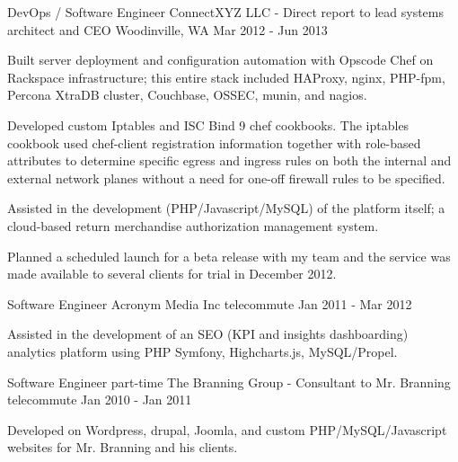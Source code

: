 \begin{cventries}
    \cventry
    {DevOps / Software Engineer}
    {ConnectXYZ LLC - Direct report to lead systems architect and CEO}
    {Woodinville, WA}
    {Mar 2012 - Jun 2013}
    {
        \begin{cvitems}
        \item {Built server deployment and configuration automation with Opscode Chef on Rackspace infrastructure; this entire stack included HAProxy, nginx, PHP-fpm, Percona XtraDB cluster, Couchbase, OSSEC, munin, and nagios.}
        \item {Developed custom Iptables and ISC Bind 9 chef cookbooks. The iptables cookbook used chef-client registration information together with role-based attributes to determine specific egress and ingress rules on both the internal and external network planes without a need for one-off firewall rules to be specified.}
        \item {Assisted in the development (PHP/Javascript/MySQL) of the platform itself; a cloud-based return merchandise authorization management system.}
        \item {Planned a scheduled launch for a beta release with my team and the service was made available to several clients for trial in December 2012.}
        \end{cvitems}
    }

    \cventry
    {Software Engineer}
    {Acronym Media Inc}
    {telecommute}
    {Jan 2011 - Mar 2012}
    {
        \begin{cvitems}
        \item {Assisted in the development of an SEO (KPI and insights dashboarding) analytics platform using PHP Symfony, Highcharts.js, MySQL/Propel.}
        \end{cvitems}
    }

    \cventry
    {Software Engineer part-time}
    {The Branning Group - Consultant to Mr. Branning}
    {telecommute}
    {Jan 2010 - Jan 2011}
    {
        \begin{cvitems}
        \item {Developed on Wordpress, drupal, Joomla, and custom PHP/MySQL/Javascript websites for Mr. Branning and his clients.}
        \end{cvitems}
    }


\end{cventries}
